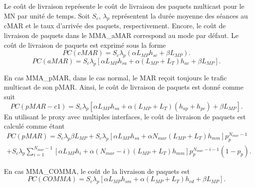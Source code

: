 Le coût de livraison représente le coût de livraison des paquets multicast pour le MN par unité de temps. Soit $ S_{c} $, $\lambda_{p} $ représentent la durée moyenne des séances au cMAR et le taux d'arrivée des paquets, respectivement. Encore, le coût de livraison de paquets dans le MMA\_aMAR correspond au mode par défaut. Le coût de livraison de paquets est exprimé sous la forme \\
\begin{equation}
PC(cMAR) = S_{c} \lambda_{p} (\alpha L_{MP} h_{sc}  + \beta L_{MP}).
\end{equation}
\begin{equation}
PC(aMAR) = S_{c} \lambda_{p} [\alpha L_{MP} h_{sa} + \alpha (L_{MP} + L_{T}) h_{ac}  + \beta L_{MP}].
\end{equation}

En cas MMA\_pMAR, dans le cas normal, le MAR reçoit toujours le trafic multicast de son pMAR. Ainsi, le coût de livraison de paquets est donné comme suit \\
\begin{equation}
PC(pMAR-c1)=  S_{c} \lambda_{p} [\alpha  L_{MP} h_{sa} +  \alpha  (L_{MP} + L_{T}) ( h_{ap} + h_{pc}) + \beta L_{MP}].
\end{equation}
En utilisant le proxy avec multiples interfaces, le coût de livraison de paquets est calculé comme étant
\begin{multline}
PC(pMAR)= S_{c} \lambda_{p}  \beta L_{MP} +  S_{c} \lambda_{p} [\alpha L_{MP} h_{sa}+ \alpha N_{mar}  (L_{MP} +L_{T}) h_{mm}] p_{p}^{N_{mar}-1} \\+ S_{c} \lambda_{p} \sum_{i=1}^{N_{mar}-1} [\alpha L_{MP} h_{i}+ \alpha  (N_{mar}-i) (L_{MP} +L_{T}) h_{mm}] p_{p}^{N_{mar}-i-1} (1-p_{p}).
\end{multline}

En cas MMA\_COMMA, le coût de la livraison de paquets est \\
\begin{equation}
PC(COMMA) = S_{c} \lambda_{p} [\alpha L_{MP} h_{sm} + \alpha (L_{MP} + L_{T}) h_{cd}  + \beta L_{MP}].
\end{equation}

